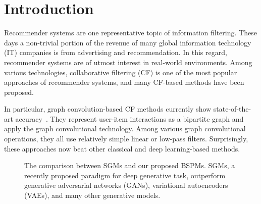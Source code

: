\documentclass[sigconf,natbib=true]{acmart}
\begin{document}



\maketitle

\section{Introduction}
Recommender systems are one representative topic of information filtering. These days a non-trivial portion of the revenue of many global information technology (IT) companies is from advertising and recommendation. In this regard, recommender systems are of utmost interest in real-world environments. Among various technologies, collaborative filtering (CF) is one of the most popular approaches of recommender systems, and many CF-based methods have been proposed.

In particular, graph convolution-based CF methods currently show state-of-the-art accuracy~\cite{He20LightGCN, Mao21UltraGCN, choi2021ltocf, Shen21GFCF,kong2022hmlet}. They represent user-item interactions as a bipartite graph and apply the graph convolutional technology. Among various graph convolutional operations, they all use relatively simple linear or low-pass filters. Surprisingly, these approaches now beat other classical and deep learning-based methods.

\begin{figure}[t]
    \centering
    \caption{The comparison between SGMs and our proposed BSPMs. SGMs, a recently proposed paradigm for deep generative task, outperform generative adversarial networks (GANs), variational autoencoders (VAEs), and many other generative models.}
    \label{fig:sgm}
\end{figure}
\end{document}
